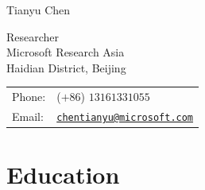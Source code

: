 \documentclass[letterpaper]{article}
\def\name{Tianyu Chen}
\renewenvironment{itemize}{
  \begin{list}{}{
    \setlength{\leftmargin}{1.5em}
  }
}{
  \end{list}
}
\begin{document}
{\huge \name}


\vspace{0.25in}

\begin{minipage}{0.45\linewidth}
Researcher\\
Microsoft Research Asia\\
Haidian District, Beijing
\end{minipage}
\begin{minipage}{0.45\linewidth}
  \begin{tabular}{ll}
    Phone: & ($+86$) $13161331055$ \\
    Email: & \href{chentianyu@microsoft.com}{\tt chentianyu@microsoft.com} \\
  \end{tabular}
\end{minipage}


%


\section*{Education}
\end{document}
